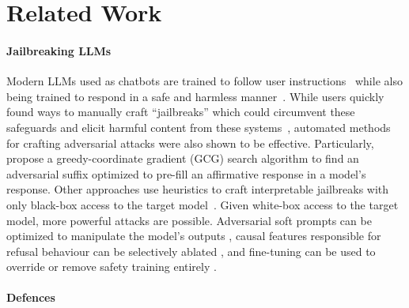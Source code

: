 \section{Related Work}

\paragraph{Jailbreaking LLMs}

Modern LLMs used as chatbots are trained to follow user instructions~\citep{ouyang_training_2022} while also being trained to respond in a safe and harmless manner~\citep{perez_red_2022}.
While users quickly found ways to manually craft ``jailbreaks'' which could circumvent these safeguards and elicit harmful content from these systems~\citep{wei_jailbroken_2023}, automated methods for crafting adversarial attacks were also shown to be effective.
Particularly,~\citet{zou_universal_2023} propose a greedy-coordinate gradient (GCG) search algorithm to find an adversarial suffix optimized to pre-fill \citep{vega_bypassing_2023} an affirmative response in a model's response. 
Other approaches use heuristics to craft interpretable jailbreaks with only black-box access to the target model~\citep{chao_jailbreaking_2023, liu_autodan_2023, zeng_johnny_2024}.
Given white-box access to the target model, more powerful attacks are possible.
Adversarial soft prompts can be optimized to manipulate the model’s outputs \citep{schwinn_soft_2024}, causal features responsible for refusal behaviour can be selectively ablated \citep{arditi_refusal_2024}, and fine-tuning can be used to override or remove safety training entirely \citep{qi_fine-tuning_2023}. 


\paragraph{Defences}

